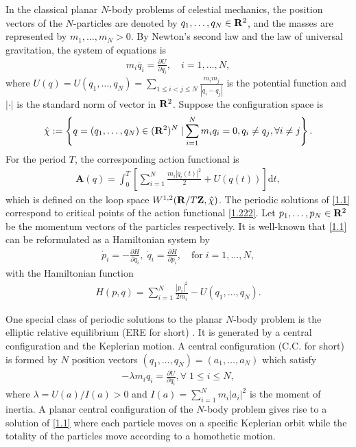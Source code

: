 \documentclass[11pt]{article}
\def\lb{\label}
\def\pt{\partial}
\def\d{{\mathrm{d}}}
\def\R{{\bf R}}
\def\Z{{\bf Z}}
\begin{document}
{In the classical planar $N$-body problems of celestial mechanics, the position vectors of the $N$-particles are denoted by $q_1 ,\dots , {q_N}\in \R^2$, and the masses are represented by
$m_1 ,\dots,{m_N} > 0$.} By Newton’s second law and the law of universal
gravitation, the system of equations is
\begin{align}
m_i\ddot{q_i} = \frac{\pt U}{\pt q_i}, \quad i = 1, {\dots, N},\lb{1.1}
\end{align}
where $U(q) = U(q_1, {\dots, q_{N}}) = \sum_{1\leq i< j\leq {N}} \frac{m_i m_j}{|q_i-q_j|}$ 
is the potential function and $|\cdot |$ {is} the standard norm of vector in $\R^2$. 
Suppose the configuration space is 
$$\hat{\chi} :=\left\{q =(q_1, {\dots, q_N})\in (\R^2)^{{N}}\;|\sum_{i = 1}^{{N}} m_iq_i = 0, q_i \neq q_j, \forall i\neq j \right\}. $$
For the period $T$, the corresponding action functional is 
\begin{align}
  \mathbf{A}(q) = \int_{0}^{T} \left[ \sum_{i = 1}^{{N}} \frac{m_i|\dot{q}_i(t)|^2}{2} +U(q(t))\right] \d t, \lb{1.222}
  \end{align}
which is defined on the loop space $W^{1,2} (\R/T \Z, \hat{\chi})$. The periodic solutions
of \eqref{1.1} correspond to critical points of the action functional \eqref{1.222}. 
Let $p_1 , {\dots, p_{N}} \in \R^2$ be the momentum vectors of the particles respectively. It is {well-known} that \eqref{1.1} can be reformulated as a Hamiltonian system by 
\begin{align}
\dot{p}_i = -\frac{\pt H}{\pt q_i}, \; \dot{q}_i  = \frac{\pt H}{\pt p_i}, \quad \mbox{for} \;i = 1, {\dots, N}, \lb{1.2}
\end{align}
with the Hamiltonian function
\begin{align} 
H(p, q) = \sum_{i =1}^{{N}} \frac{|p_i|^2}{2m_i} - U(q_1,{\dots, q_{N}}).\lb{1.3}
\end{align}

One special class of periodic solutions to the planar $N$-body problem is the elliptic relative equilibrium (ERE for short) \cite{MS}. It is generated by a central configuration and the Keplerian motion.
A central configuration (C.C. for short) is formed by $N$ position vectors $\left(q_{1}, \ldots, q_{N}\right)=\left(a_{1}, \ldots, a_{N}\right)$ which satisfy
\begin{align}
	-\lambda m_{i} q_{i}=\frac{\partial U}{\partial q_{i}}, \forall\; 1\leq i \leq N, \lb{eqn:cc}
\end{align}
where $\lambda =U(a) /  {I(a)}>0$ and $I(a)={\sum_{i=1}^N} m_{i}|a_{i}|^{2}$ is the moment of inertia.
A planar central configuration of the $N$-body problem gives rise to a solution of \eqref{1.1} where each particle moves on a specific Keplerian orbit while the totality of the particles move according to a homothetic motion. 
\end{document}
